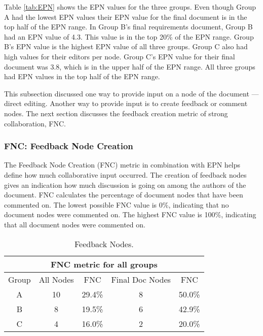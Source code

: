 Table \ref{tab:EPN} shows the EPN values for the three groups.  Even though
Group A had the lowest EPN values their EPN value for the final document is
in the top half of the EPN range.  In Group B's final requirements
document, Group B had an EPN value of 4.3.  This value is in the top 20\%
of the EPN range.  Group B's EPN value is the highest EPN value of all
three groups.  Group C also had high values for their editors per node.
Group C's EPN value for their final document was 3.8, which is in the upper
half of the EPN range.  All three groups had EPN values in the top half of
the EPN range.


This subsection discussed one way to provide input on a node of the document ---
direct editing.  Another way to provide input is to create feedback or
comment nodes.  The next section discusses the feedback creation metric of strong
collaboration, FNC.

\subsubsection{FNC: Feedback Node Creation}

The Feedback Node Creation (FNC) metric in combination with EPN helps define
how much collaborative input occurred. The creation of feedback nodes gives
an indication how much discussion is going on among the authors of the
document.  FNC calculates the percentage of document nodes that have been
commented on. The lowest possible FNC value is 0\%, indicating that no
document nodes were commented on.  The highest FNC value is 100\%,
indicating that all document nodes were commented on.  

\small
\begin{table}[htb]
  \caption{Feedback Nodes.}
  \begin{center}
    \begin{tabular}{|c|c|c||c|c|}
      \hline
      \multicolumn{5}{|c|}{\rule[-3mm]{0mm}{8mm}\bf FNC metric for
      all groups}\\ \hline
      Group&All Nodes&FNC&Final Doc Nodes&FNC\\ \hline
      \hline
      A&10&29.4\%&8&50.0\%\\ \hline
      B&8&19.5\%&6&42.9\%\\ \hline
      C&4&16.0\%&2&20.0\%\\ \hline
    \end{tabular}
  \end{center}
  \label{tab:feedback}
\end{table}
\normalsize

